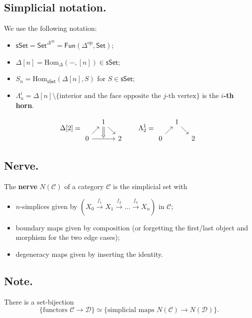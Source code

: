 \documentclass{article}
\numberwithin{equation}{subsection}
\renewcommand{\ss}[1]{\subsection{#1}}
\newcommand{\Hom}{\mathrm{Hom}}
\newcommand{\sset}{\mathsf{sSet}}
\newcommand{\C}{\mathcal{C}}
\newcommand{\D}{\mathcal{D}}
\begin{document}
        \ss{Simplicial notation.}
            We use the following notation:
            \begin{itemize}
                \item $\sset = \mathsf{Set}^{\Delta^\mathrm{op}} = \mathsf{Fun}(\Delta^\mathrm{op},\mathsf{Set})$;
                \item $\Delta[n] = \Hom_\Delta(-,[n])\in\sset$;
                \item $S_n = \Hom_\sset(\Delta[n],S)$ for $S\in\sset$;
                \item $\Lambda^i_n = \Delta[n]\setminus\{\text{interior and the face opposite the }j\text{-th vertex}\}$ is the \textbf{$i$-th horn}.
            \end{itemize}
            \[
                \Delta[2] =
                \begin{tikzcd}[row sep=1em,column sep=1em]
                    &1\ar{dr}\ar[Rightarrow]{d}&\\
                    0\ar{ur}\ar{rr}&\,&2
                \end{tikzcd}
                \qquad\Lambda_2^1 =
                \begin{tikzcd}[row sep=1em,column sep=1em]
                    &1\ar{dr}&\\
                    0\ar{ur}&\,&2
                \end{tikzcd}
            \]

        \ss{Nerve.}
            The \textbf{nerve} $N(\C)$ of a category $\C$ is the simplicial set with
            \begin{itemize}
                \item $n$-simplices given by $(X_0\xrightarrow{f_1}X_1\xrightarrow{f_2}\ldots\xrightarrow{f_n}X_n)$ in $\C$;
                \item boundary maps given by composition (or forgetting the first/last object and morphism for the two edge cases);
                \item degeneracy maps given by inserting the identity.
            \end{itemize}

        \ss{Note.}
            There is a set-bijection
            \[
                \{\text{functors }\C\to\D\}\simeq\{\text{simplicial maps }N(\C)\to N(\D)\}.
            \]
\end{document}
